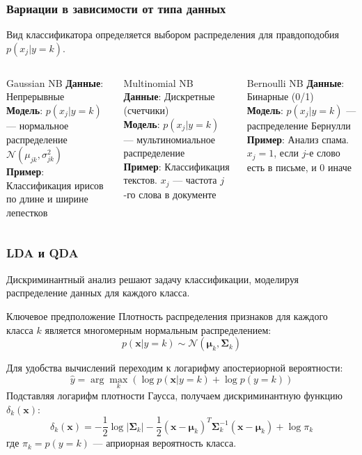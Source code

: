 \documentclass[notheorems, handout]{beamer}
\newcommand{\vect}[1]{\mathbf{#1}}
\newcommand{\matr}[1]{\boldsymbol{#1}}
\begin{document}
\begin{frame}
  \frametitle{Вариации в зависимости от типа данных}
  Вид классификатора определяется выбором распределения для правдоподобия $p(x_j|y=k)$.
  
  \begin{columns}[T]
      \begin{block}{Gaussian NB}
        \textbf{Данные}: Непрерывные\\
        \textbf{Модель}: $p(x_j|y=k)$ --- нормальное распределение $\mathcal{N}(\mu_{jk}, \sigma_{jk}^2)$\\
        \textbf{Пример}: Классификация ирисов по длине и ширине лепестков
      \end{block}
      
      \begin{block}{Multinomial NB}
        \textbf{Данные}: Дискретные (счетчики)\\
        \textbf{Модель}: $p(x_j|y=k)$ --- мультиномиальное распределение\\
        \textbf{Пример}: Классификация текстов. $x_j$ --- частота $j$-го слова в документе
      \end{block}
      
      \begin{block}{Bernoulli NB}
        \textbf{Данные}: Бинарные (0/1)\\
        \textbf{Модель}: $p(x_j|y=k)$ --- распределение Бернулли\\
        \textbf{Пример}: Анализ спама. $x_j=1$, если $j$-е слово есть в письме, и $0$ иначе
      \end{block}
  \end{columns}
\end{frame}

\begin{frame}
    \frametitle{LDA и QDA}
    Дискриминантный анализ  решают задачу классификации, моделируя распределение данных для каждого класса.
    \begin{block}{Ключевое предположение}
     Плотность распределения признаков для каждого класса $k$ является многомерным нормальным распределением:
     $$ p(\vect{x}|y=k) \sim \mathcal{N}(\matr{\mu}_k, \matr{\Sigma}_k) $$
    \end{block}
    Для удобства вычислений переходим к логарифму апостериорной вероятности:
    $$ \hat{y} = \arg\max_k \left( \log p(\vect{x}|y=k) + \log p(y=k) \right) $$
    Подставляя логарифм плотности Гаусса, получаем дискриминантную функцию $\delta_k(\vect{x})$:
    $$ \delta_k(\vect{x}) = -\frac{1}{2}\log|\matr{\Sigma}_k| - \frac{1}{2}(\vect{x}-\matr{\mu}_k)^T\matr{\Sigma}_k^{-1}(\vect{x}-\matr{\mu}_k) + \log \pi_k $$
    где $\pi_k = p(y=k)$ --- априорная вероятность класса.
\end{frame}
\end{document}
